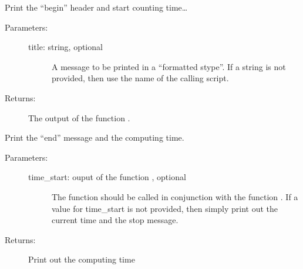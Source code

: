 \documentclass[letterpaper,10pt,english]{sphinxmanual}
\begin{document}
\begin{fulllineitems}
\label{\detokenize{appendices:s2Dcd.utili.print_start}}
Print the “begin” header and start counting time…
\begin{description}
\item[{Parameters:}] \leavevmode\begin{description}
\item[{title: string, optional}] \leavevmode
A message to be printed in a “formatted stype”. If a
string is not provided, then use the name of the calling
script.

\end{description}

\item[{Returns:}] \leavevmode
The output of the function .

\end{description}

\end{fulllineitems}


\begin{fulllineitems}
\label{\detokenize{appendices:s2Dcd.utili.print_stop}}
Print the “end” message and the computing time.
\begin{description}
\item[{Parameters:}] \leavevmode\begin{description}
\item[{time\_start: ouput of the function {\hyperref[\detokenize{appendices:s2Dcd.utili.print_start}]{}}, optional}] \leavevmode
The function should be called in conjunction with the
function . If a value for time\_start is not
provided, then simply print out the current time and the
stop message.

\end{description}

\item[{Returns:}] \leavevmode
Print out the computing time

\end{description}

\end{fulllineitems}
\end{document}
